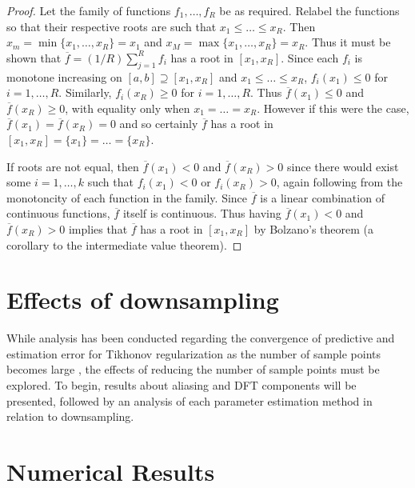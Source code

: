 \documentclass[12pt]{article}
\begin{document}
\begin{proof}
Let the family of functions $f_1,\ldots,f_R$ be as required. Relabel the functions so that their respective roots are such that $x_1 \leq \ldots \leq x_R$. Then $x_m = \min\{x_1,\ldots,x_R\} = x_1$ and $x_M = \max\{x_1,\ldots,x_R\} = x_R$. Thus it must be shown that $\overline{f} = (1/R)\sum_{j=1}^R f_i$ has a root in $[x_1,x_R]$. Since each $f_i$ is monotone increasing on $[a,b] \supseteq [x_1,x_R]$ and $x_1 \leq \ldots \leq x_R$, $f_i(x_1) \leq 0$ for $i = 1,\ldots,R$. Similarly, $f_i(x_R) \geq 0$ for $i = 1,\ldots,R$. Thus $\overline{f}(x_1) \leq 0$ and $\overline{f}(x_R) \geq 0$, with equality only when $x_1 = \ldots = x_R$. However if this were the case, $\overline{f}(x_1) = \overline{f}(x_R) = 0$ and so certainly $\overline{f}$ has a root in $[x_1,x_R] = \{x_1\} = \ldots = \{x_R\}$. \par 
If roots are not equal, then $\overline{f}(x_1) < 0$ and $\overline{f}(x_R) > 0$ since there would exist some $i = 1,\ldots,k$ such that $f_i(x_1) < 0$ or $f_i(x_R) > 0$, again following from the monotoncity of each function in the family. Since $\overline{f}$ is a linear combination of continuous functions, $\overline{f}$ itself is continuous. Thus having $\overline{f}(x_1) < 0$ and $\overline{f}(x_R) > 0$ implies that $\overline{f}$ has a root in $[x_1,x_R]$ by Bolzano's theorem (a corollary to the intermediate value theorem).
\end{proof}

\section{Effects of downsampling} \label{sec:Effects of downsampling}
While analysis has been conducted regarding the convergence of predictive and estimation error for Tikhonov regularization as the number of sample points becomes large \cite{Vogel:2002}, the effects of reducing the number of sample points must be explored. To begin, results about aliasing and DFT components will be presented, followed by an analysis of each parameter estimation method in relation to downsampling. 

\section{Numerical Results} \label{Numerical results}
\end{document}

